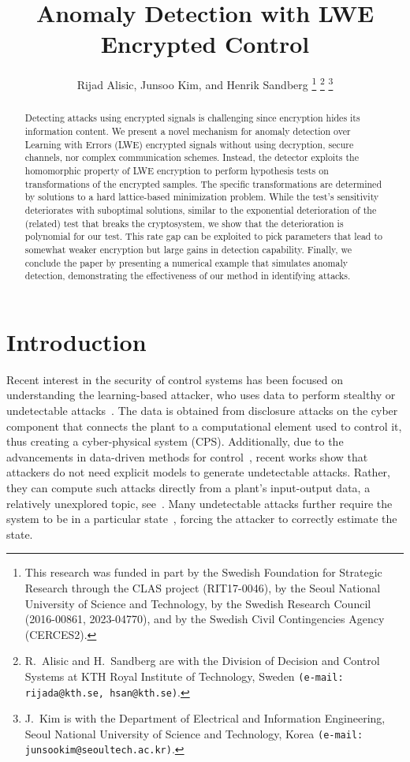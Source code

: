 \documentclass[journal, twoside, web]{ieeecolorpreprint}
\title{Anomaly Detection with LWE Encrypted Control} %
\author{Rijad Alisic, Junsoo Kim, and Henrik Sandberg
\thanks{This research was funded in part by the Swedish Foundation for Strategic Research through the CLAS project (RIT17-0046), by the Seoul National University of Science and Technology, by the Swedish Research Council (2016-00861, 2023-04770), and by the Swedish Civil Contingencies Agency (CERCES2).}
\thanks{R.~Alisic and H.~Sandberg are with the Division of Decision and Control Systems at KTH Royal Institute of Technology, Sweden {\tt \small (e-mail: rijada@kth.se, hsan@kth.se)}.}
\thanks{J.~Kim is with the Department of Electrical and Information Engineering, Seoul National University of Science and Technology, Korea {\tt \small (e-mail: junsookim@seoultech.ac.kr)}.}
}
\begin{document}
\maketitle




\begin{abstract}
    Detecting attacks using encrypted signals is challenging since encryption hides its information content. We present a novel mechanism for anomaly detection over Learning with Errors (LWE) encrypted signals without using decryption, secure channels, nor complex communication schemes. Instead, the detector exploits the homomorphic property of LWE encryption to perform hypothesis tests on transformations of the encrypted samples. The specific transformations are determined by solutions to a hard lattice-based minimization problem. While the test's sensitivity deteriorates with suboptimal solutions, similar to the exponential deterioration of the (related) test that breaks the cryptosystem, we show that the deterioration is polynomial for our test. This rate gap can be exploited to pick parameters that lead to somewhat weaker encryption but large gains in detection capability. Finally, we conclude the paper by presenting a numerical example that simulates anomaly detection, demonstrating the effectiveness of our method in identifying attacks.
\end{abstract}


\section{Introduction} \label{sec:introduction}
Recent interest in the security of control systems has been focused on understanding the learning-based attacker, who uses data to perform stealthy or undetectable attacks~\cite{muller2018,park2016}. The data is obtained from disclosure attacks on the cyber component that connects the plant to a computational element used to control it, thus creating a cyber-physical system (CPS). Additionally, due to the advancements in data-driven methods for control~\cite{Coulson2019,proctor2016}, recent works show that attackers do not need explicit models to generate undetectable attacks. Rather, they can compute such attacks directly from a plant's input-output data, a relatively unexplored topic, see~\cite{wang2019,alisic2021ecc,taheri2021,adachi2023}. Many undetectable attacks further require the system to be in a particular state~\cite{TEIXEIRA2015,weerakkody2015,gheitasi2022}, forcing the attacker to correctly estimate the state. 
\end{document}
